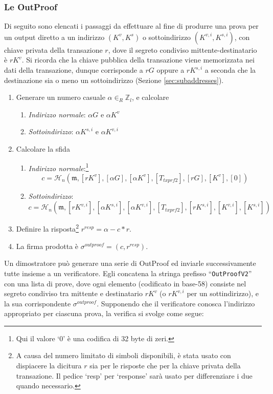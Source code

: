 \subsubsection*{Le OutProof}

Di seguito sono elencati i passaggi da effettuare al fine di produrre una prova per un output diretto a un indirizzo \((K^{v},K^{s})\) o sottoindirizzo \((K^{v,i},K^{s,i})\), con chiave privata della transazione \(r\), dove il segreto condiviso mittente-destinatario è \(rK^v\). Si ricorda che la chiave pubblica della transazione viene memorizzata nei dati della transazione, dunque corrisponde a \(rG\) oppure a \(rK^{s,i}\) a seconda che la destinazione sia o meno un sottoindirizzo (Sezione \ref{sec:subaddresses}).

\begin{enumerate}
	\item Generare un numero casuale \(\alpha \in_R \mathbb{Z}_l\), e calcolare
	\begin{enumerate}
	    \item {\em Indirizzo normale}: \(\alpha G\) e \(\alpha K^v\)
	    \item {\em Sottoindirizzo}: \(\alpha K^{s,i}\) e \(\alpha K^{v,i}\)
	\end{enumerate}
	\item Calcolare la sfida
	\begin{enumerate}
	    \item {\em Indirizzo normale}:\footnote{Qui il valore ‘0’ è una codifica di 32 byte di zeri.}
	    \[c = \mathcal{H}_n(\mathfrak{m},[rK^v], [\alpha G], [\alpha K^v], [T_{txprf2}], [rG], [K^v], [0])\]
	    \item {\em Sottoindirizzo}:
	    \[c = \mathcal{H}_n(\mathfrak{m},[rK^{v,i}], [\alpha K^{s,i}], [\alpha K^{v,i}], [T_{txprf2}], [rK^{s,i}], [K^{v,i}], [K^{s,i}])\]
	\end{enumerate}
	\item Definire la risposta\footnote{A causa del numero limitato di simboli disponibili, è stata usato con dispiacere la dicitura \(r\) sia per le risposte che per la chiave privata della transazione. Il pedice `resp' per `response' sarà usato per differenziare i due quando necessario.} \(r^{resp} = \alpha - c*r\).
	\item La firma prodotta è \(\sigma^{outproof} = (c, r^{resp})\).
\end{enumerate}{}

Un dimostratore può generare una serie di OutProof ed inviarle successivamente tutte insieme a un verificatore. Egli concatena la stringa prefisso ``{\tt OutProofV2}'' con una lista di prove, dove ogni elemento (codificato in base-58) consiste nel segreto condiviso tra mittente e destinatario $r K^v$ (o $r K^{v,i}$ per un sottindirizzo), e la sua corrispondente $\sigma^{outproof}$. Supponendo che il verificatore conosca l’indirizzo appropriato per ciascuna prova, la verifica si svolge come segue:

